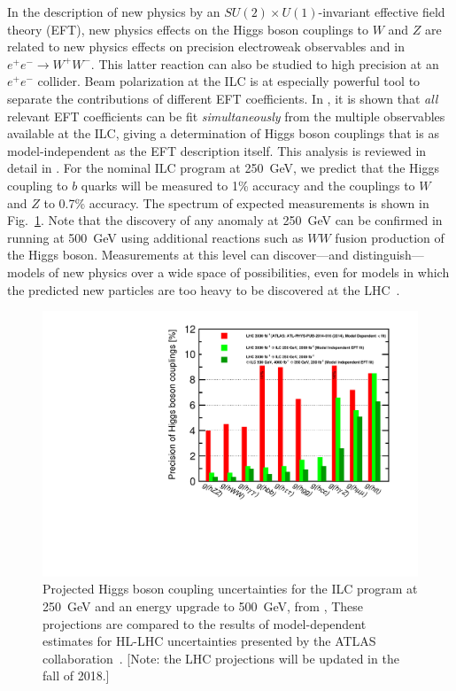 \documentclass[%
 reprint,
 amsmath,amssymb,
 aps,
]{revtex4-1}
\def\ee{e^+e^-}
\begin{document}
In the description of new physics by an  $SU(2)\times U(1)$-invariant
effective field theory (EFT), new physics effects on the  Higgs boson
couplings to $W$ and $Z$ are related to new physics effects on
precision electroweak observables and in $\ee\to W^+W^-$.   This
latter reaction can also be studied to high precision at an $\ee$
collider.  Beam polarization at the ILC is at especially powerful tool
to separate the contributions of different EFT
coefficients.    In \cite{Barklow:2017suo}, it is shown that {\it all}
relevant EFT
coefficients can be fit {\it simultaneously} from the multiple
observables available at the ILC, giving a 
determination of Higgs boson couplings that is as
model-independent as the EFT description itself. 
 This analysis is reviewed in detail in
\cite{ILCforESS}. 
For the nominal ILC program at 250~GeV, we predict that the Higgs
coupling to $b$ quarks will be measured to 1\% accuracy and the
couplings to $W$ and $Z$ to 0.7\% accuracy.  The spectrum of  expected
measurements is shown in Fig.~\ref{fig:Higgssummary}.  Note that the 
discovery of any anomaly at 250~GeV can be confirmed in running at
500~GeV 
using additional reactions  such as $WW$ fusion production of the
Higgs boson.   Measurements at this
level can discover---and distinguish---models of new physics over a
wide space of possibilities, even for models in which the predicted new
particles are too heavy to be discovered at the LHC~\cite{Barklow:2017suo}.

\begin{figure}
\begin{center}
\includegraphics[width=0.95\hsize]{figures/DeltaH_EFT.pdf}
\end{center}
\caption{Projected Higgs boson coupling uncertainties for the ILC
  program at 250~GeV and an energy upgrade to 500~GeV, from \cite{Fujii:2017vwa}, 
 These projections are compared to
  the results of model-dependent estimates for HL-LHC uncertainties 
presented by the ATLAS 
collaboration~\cite{H2aaLHC}. [Note: the LHC projections will be
updated in the fall of 2018.]}
\label{fig:Higgssummary}
\end{figure}
\end{document}
